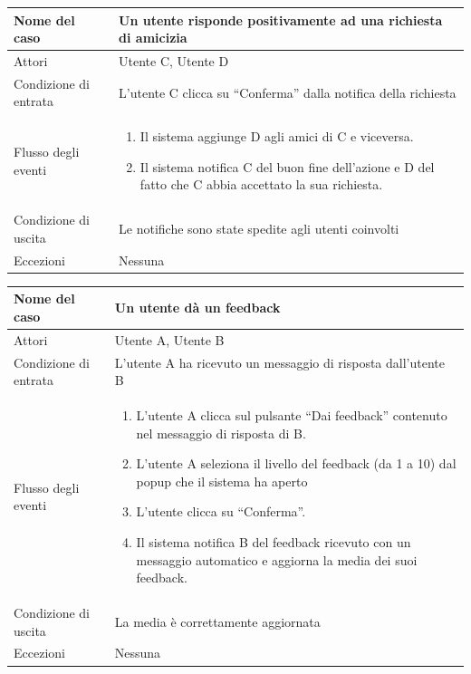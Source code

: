\documentclass[a4paper,12pt]{article}
\begin{document}
\begin{tabularx}{\textwidth}{|l|X|}
\hline Nome del caso & Un utente risponde positivamente ad una richiesta di amicizia \\
\hline Attori & Utente C, Utente D \\ 
\hline Condizione di entrata & L'utente C clicca su “Conferma” dalla notifica della richiesta \\
\hline Flusso degli eventi & 
\begin{enumerate}
\itemsep0em 
\item Il sistema aggiunge D agli amici di C e viceversa.
\item Il sistema notifica C del buon fine dell'azione e D del fatto che C abbia accettato la sua richiesta.
\end{enumerate}
 \\ 
\hline Condizione di uscita & Le notifiche sono state spedite agli utenti coinvolti \\
\hline Eccezioni & Nessuna
\\
\hline 
\end{tabularx}
\clearpage
\begin{tabularx}{\textwidth}{|l|X|}
\hline Nome del caso & Un utente dà un feedback \\
\hline Attori & Utente A, Utente B \\ 
\hline Condizione di entrata & L'utente A ha ricevuto un messaggio di risposta dall'utente B \\
\hline Flusso degli eventi & 
\begin{enumerate}
\itemsep0em 
\item L'utente A clicca sul pulsante “Dai feedback” contenuto nel messaggio di risposta di B.
\item L'utente A seleziona il livello del feedback (da 1 a 10) dal popup che il sistema ha aperto
\item L'utente clicca su “Conferma”.
\item Il sistema notifica B del feedback ricevuto con un messaggio automatico e aggiorna la media dei suoi feedback.
\end{enumerate}
 \\ 
\hline Condizione di uscita & La media è correttamente aggiornata \\
\hline Eccezioni & Nessuna
\\
\hline 
\end{tabularx} \\[1\baselineskip]
\end{document}
